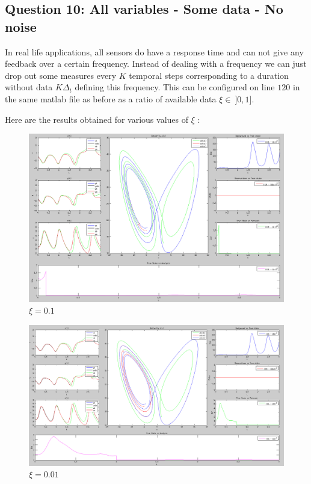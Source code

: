 \documentclass[11pt,a4paper]{article}
\begin{document}
\clearpage
\subsection{Question 10: All variables - Some data - No noise}

In real life applications, all sensors do have a response time and can not give any feedback over a certain frequency. Instead of dealing with a frequency we can just drop out some measures every $K$ temporal steps corresponding to a duration without data $K \Delta_t$ defining this frequency.
This can be configured on line $120$ in the same matlab file as before as a ratio of available data $\xi \in\ ]0,1]$.

\vskip 0.3cm
\noindent Here are the results obtained for various values of $\xi$ :

\begin{figure}[H]
   \centering
   \includegraphics[width=12cm]{Q10a.png}
   \caption{$\xi = 0.1$}
\end{figure}

\begin{figure}[H]
   \centering
   \includegraphics[width=12cm]{Q10b.png}
   \caption{$\xi = 0.01$}
\end{figure}
\end{document}
